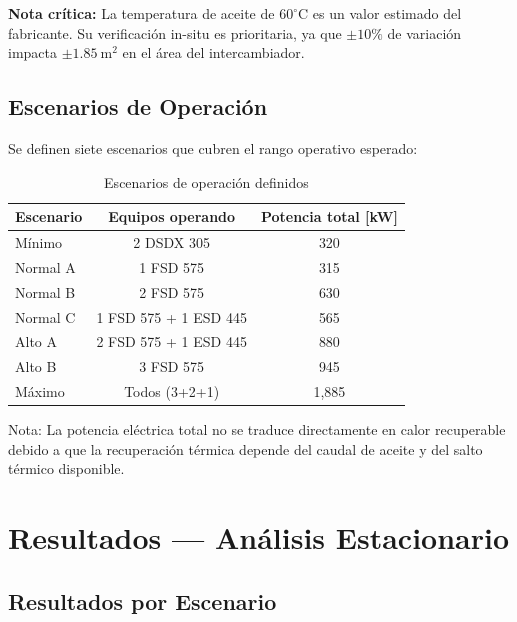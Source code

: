 \documentclass[11pt,a4paper]{report}
\begin{document}
\textbf{Nota crítica:} La temperatura de aceite de $60^\circ\text{C}$ es un valor estimado del fabricante. Su verificación in-situ es prioritaria, ya que $\pm 10\%$ de variación impacta $\pm 1.85\ \text{m}^2$ en el área del intercambiador.

\section{Escenarios de Operación}

Se definen siete escenarios que cubren el rango operativo esperado:

\begin{table}[H]
\centering
\caption{Escenarios de operación definidos}
\begin{tabular}{@{}lcc@{}}
\toprule
\textbf{Escenario} & \textbf{Equipos operando} & \textbf{Potencia total [kW]} \\
\midrule
Mínimo & 2 DSDX 305 & 320 \\
Normal A & 1 FSD 575 & 315 \\
Normal B & 2 FSD 575 & 630 \\
Normal C & 1 FSD 575 + 1 ESD 445 & 565 \\
Alto A & 2 FSD 575 + 1 ESD 445 & 880 \\
Alto B & 3 FSD 575 & 945 \\
Máximo & Todos (3+2+1) & 1,885 \\
\bottomrule
\end{tabular}
\end{table}

Nota: La potencia eléctrica total no se traduce directamente en calor recuperable debido a que la recuperación térmica depende del caudal de aceite y del salto térmico disponible.

\chapter{Resultados — Análisis Estacionario}

\section{Resultados por Escenario}
\end{document}
